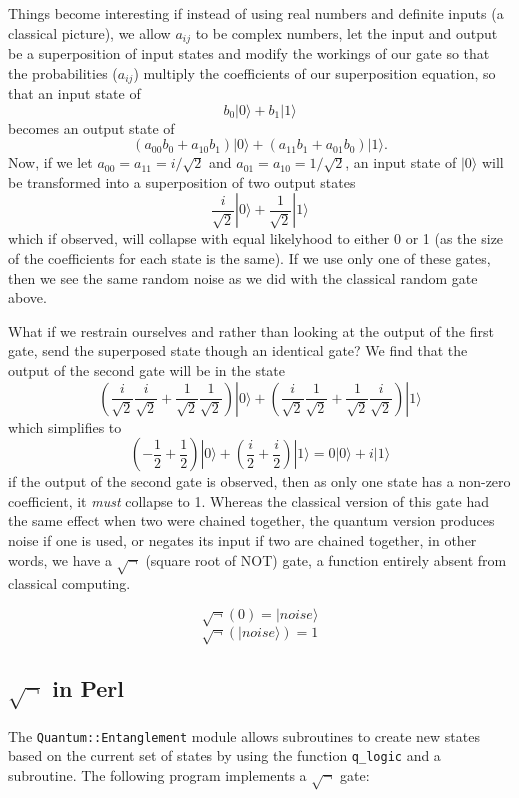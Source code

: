 \documentclass{article}      %
\newcommand{\ptt}[1]{\texttt{#1}}    %
\begin{document}
Things become interesting if instead of using real numbers and
definite inputs (a classical
picture), we allow $a_{ij}$ to be complex numbers, let the input
and output be a superposition of
input states and modify the workings of our gate so that the
probabilities ($a_{ij}$) multiply the coefficients of our
superposition equation, so that an input state of
\[
	b_0|0\rangle + b_1|1\rangle
\]
becomes an output state of
\[
	(a_{00}b_0 + a_{10}b_1)|0\rangle +
	(a_{11}b_1 + a_{01}b_0)|1\rangle.
\]
Now, if we let $a_{00} = a_{11} = i/\sqrt{2} $ and
$a_{01} = a_{10} = 1/\sqrt{2}$, an input state of $|0\rangle$
will be transformed into a superposition of two output states
\[
	\frac{i}{\sqrt{2}}|0\rangle + \frac{1}{\sqrt{2}}|1\rangle
\]
which if observed, will collapse with equal likelyhood to either 0 or
1 (as the size of the coefficients for each state is the same).  If we
use only one of these gates, then we see the same random noise as we
did with the classical random gate above.

What if we restrain ourselves and rather than looking at the output of
the first gate, send the superposed state though an identical
gate? We find that the output of the second gate will be in the state
\[
	\left( \frac{i}{\sqrt{2}}\frac{i}{\sqrt{2}}
	+ \frac{1}{\sqrt{2}}\frac{1}{\sqrt{2}} \right)| 0 \rangle
       +\left( \frac{i}{\sqrt{2}}\frac{1}{\sqrt{2}}
	+ \frac{1}{\sqrt{2}}\frac{i}{\sqrt{2}} \right)| 1 \rangle
\]
which simplifies to
\[
	\left(-\frac{1}{2}+\frac{1}{2}\right)|0\rangle
     +	\left(\frac{i}{2} +\frac{i}{2}\right)|1\rangle
		= 0|0\rangle + i|1\rangle
\]
if the output of the second gate is observed, then as only one
state has a non-zero coefficient, it \emph{must} collapse to 1.
Whereas the classical version of this gate had the same effect when
two were chained together, the quantum version produces noise if one
is used, or negates its input if two are chained together, in other
words, we have a $\sqrt{\neg}$ (square root of NOT) gate, a
function entirely absent from classical computing.

\[
	\sqrt{\neg}(0) = |\textit{noise}\rangle
\]
\[
	\sqrt{\neg}(|\textit{noise}\rangle) = 1
\]

\subsection{$\sqrt{\neg}$ in Perl}

The \ptt{Quantum::Entanglement} module allows subroutines to create new
states based on the current set of states by using the function
\ptt{q\_logic} and a subroutine.  The following program implements a
$\sqrt{\neg}$ gate:
\end{document}
